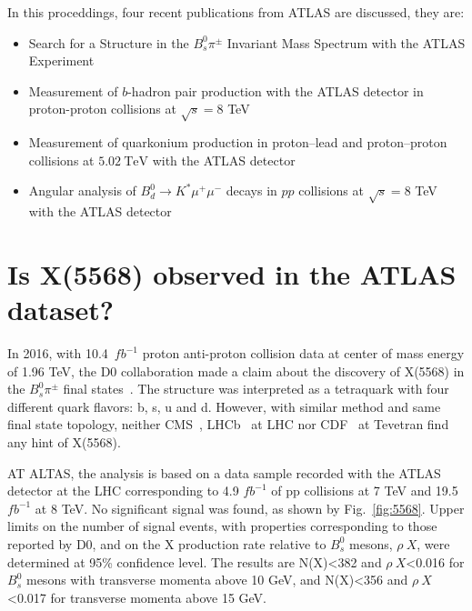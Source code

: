 \documentclass[epj]{webofc}
\begin{document}
In this proceddings, four recent publications from ATLAS are discussed, they are:
\begin{itemize}
  \item Search for a Structure in the $B^0_s \pi^\pm$ Invariant Mass Spectrum with the ATLAS Experiment~\cite{x5568}
  \item Measurement of $b$-hadron pair production with the ATLAS detector in proton-proton collisions at $\sqrt{s}=8$ TeV~\cite{bpair}
  \item Measurement of quarkonium production in proton–lead and proton–proton collisions at $5.02~\mathrm {TeV}$ with the ATLAS detector~\cite{quark_pro}
  \item Angular analysis of $B^0_d \rightarrow K^{*}\mu^+\mu^-$ decays in $pp$ collisions at $\sqrt{s}= 8$ TeV with the ATLAS detector~\cite{kmumu}
\end{itemize}

\section{Is X(5568) observed in the ATLAS dataset?}
\label{5568}

In 2016, with 10.4~$fb^{-1}$ proton anti-proton collision data at center of mass energy of 1.96 TeV, the D0 collaboration made a claim about
the discovery of X(5568) in the $B^0_s \pi^\pm$ final states~\cite{D0:2016mwd}. The structure was interpreted as a tetraquark with four 
different quark flavors: b, s, u and d. However, with similar method and same final state topology, neither CMS~\cite{Sirunyan:2017ofq}, LHCb~\cite{Aaij:2016iev} 
at LHC nor CDF~\cite{Aaltonen:2017voc} at Tevetran find any hint of X(5568).   

AT ALTAS, the analysis is based on a data sample recorded with the ATLAS detector at the LHC corresponding to 4.9 
$fb^{-1}$ of pp collisions at 7 TeV and 19.5 $fb^{-1}$ at 8 TeV.
No significant signal was found, as shown by Fig.~\ref{fig:5568}. Upper limits on the number of signal events, with properties corresponding to 
those reported by D0, and on the X production rate relative to $B_{s}^{0}$ mesons, $\rho~X$, were determined at 95\% confidence level. 
The results are N(X)<382 and $\rho~X$<0.016 for $B_{s}^{0}$ mesons with transverse momenta above 10 GeV, and N(X)<356 and $\rho~X$<0.017 for 
transverse momenta above 15 GeV. 
\end{document}
